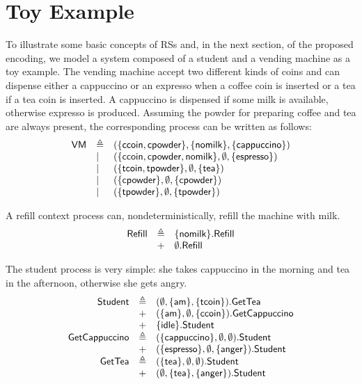 
\section{Toy Example}\label{sec:student}

To illustrate some basic concepts of RSs and, in the next section, of the proposed encoding, we model a system composed of a student and a vending machine as a toy example.
The vending machine accept two different kinds of coins and can dispense either a cappuccino or an expresso when a coffee coin is inserted or a tea if a tea coin is inserted. A cappuccino is dispensed if some milk is available, otherwise expresso is produced.
Assuming the powder for preparing coffee and tea are always present, the corresponding process can be written as follows:
\[
\begin{array}{lll}
\mathsf{VM} & \triangleq & (\{{\text{\sffamily ccoin}},{\text{\sffamily cpowder}}\},\{{\text{\sffamily nomilk}}\},\{{\text{\sffamily cappuccino}}\})\\
& | & (\{{\text{\sffamily ccoin}},{\text{\sffamily cpowder}},{\text{\sffamily nomilk}}\},\emptyset,\{{\text{\sffamily espresso}}\})\\
& | & (\{{\text{\sffamily tcoin}},{\text{\sffamily tpowder}}\},\emptyset,\{{\text{\sffamily tea}}\})\\
& | & (\{{\text{\sffamily cpowder}}\},\emptyset,\{{\text{\sffamily cpowder}}\})\\
& | & (\{{\text{\sffamily tpowder}}\},\emptyset,\{{\text{\sffamily tpowder}}\})\\
\end{array}
\]

A refill context process can, nondeterministically, refill the machine with milk.
\[
\begin{array}{lll}
\mathsf{Refill} & \triangleq & \{{\text{\sffamily nomilk}}\}.\mathsf{Refill}\\
& + & \emptyset.\mathsf{Refill}\\
\end{array}
\]

The student process is very simple: she takes cappuccino in the morning and tea in the afternoon, otherwise she gets angry.
\[
\begin{array}{rll}
\mathsf{Student} & \triangleq & (\emptyset,\{{\text{\sffamily am}}\},\{{\text{\sffamily tcoin}}\}).\mathsf{GetTea}\\
& + & (\{{\text{\sffamily am}}\},\emptyset,\{{\text{\sffamily ccoin}}\}).\mathsf{GetCappuccino}\\
& + & \{{\text{\sffamily idle}}\}.\mathsf{Student}\\
\mathsf{GetCappuccino} & \triangleq & (\{{\text{\sffamily cappuccino}}\},\emptyset,\emptyset).\mathsf{Student}\\
& + & (\{{\text{\sffamily espresso}}\},\emptyset,\{{\text{\sffamily anger}}\}).\mathsf{Student}\\
\mathsf{GetTea} & \triangleq & (\{{\text{\sffamily tea}}\},\emptyset,\emptyset).\mathsf{Student}\\
& + & (\emptyset,\{{\text{\sffamily tea}}\},\{{\text{\sffamily anger}}\}).\mathsf{Student}\\
\end{array}
\]

